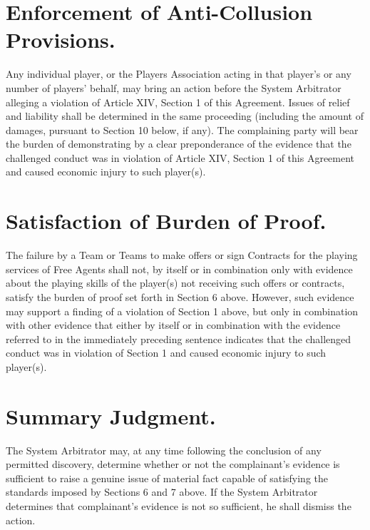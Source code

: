 \documentclass[
]{book}
\begin{document}
\hypertarget{enforcement-of-anti-collusion-provisions.}{%
\section{Enforcement of Anti-Collusion Provisions.}\label{enforcement-of-anti-collusion-provisions.}}

Any individual player, or the Players Association acting in that player's or any number of players' behalf, may bring an action before the System Arbitrator alleging a violation of Article XIV, Section 1 of this Agreement. Issues of relief and liability shall be determined in the same proceeding (including the amount of damages, pursuant to Section 10 below, if any). The complaining party will bear the burden of demonstrating by a clear preponderance of the evidence that the challenged conduct was in violation of Article XIV, Section 1 of this Agreement and caused economic injury to such player(s).

\hypertarget{satisfaction-of-burden-of-proof.}{%
\section{Satisfaction of Burden of Proof.}\label{satisfaction-of-burden-of-proof.}}

The failure by a Team or Teams to make offers or sign Contracts for the playing services of Free Agents shall not, by itself or in combination only with evidence about the playing skills of the player(s) not receiving such offers or contracts, satisfy the burden of proof set forth in Section 6 above. However, such evidence may support a finding of a violation of Section 1 above, but only in combination with other evidence that either by itself or in combination with the evidence referred to in the immediately preceding sentence indicates that the challenged conduct was in violation of Section 1 and caused economic injury to such player(s).

\hypertarget{summary-judgment.}{%
\section{Summary Judgment.}\label{summary-judgment.}}

The System Arbitrator may, at any time following the conclusion of any permitted discovery, determine whether or not the complainant's evidence is sufficient to raise a genuine issue of material fact capable of satisfying the standards imposed by Sections 6 and 7 above. If the System Arbitrator determines that complainant's evidence is not so sufficient, he shall dismiss the action.
\end{document}
